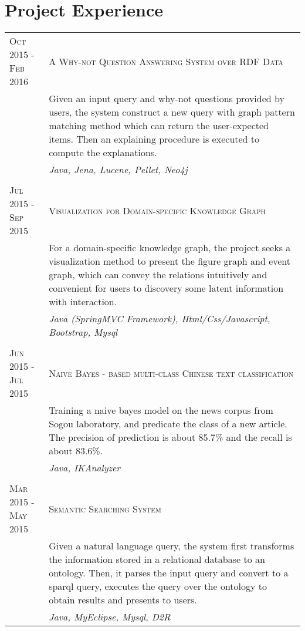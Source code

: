 \documentclass[a4paper,10pt]{article}
\begin{document}
\section{Project Experience}
\begin{tabular}{R{3.2cm}|p{13cm}}
%
 \textsc{Oct 2015 - Feb 2016} 		& \textsc{A Why-not Question Answering System over RDF Data} \\
 							& \small{Given an input query and why-not questions provided by users, the system construct a new query with graph pattern matching method which can return the user-expected items. Then an explaining procedure is executed to compute the explanations.} \\
                            & \emph{Java, Jena, Lucene, Pellet, Neo4j} \\
%
  \\
 \textsc{Jul 2015 - Sep 2015} 		& \textsc{Visualization for Domain-specific Knowledge Graph} \\
 							& \small{For a domain-specific knowledge graph, the project seeks a visualization method to present the figure graph and event graph, which can convey the relations intuitively and convenient for users to discovery some latent information with interaction.}\\
                            & \emph{Java (SpringMVC Framework), Html/Css/Javascript, Bootstrap, Mysql} \\
%
%
  \\
 \textsc{Jun 2015 - Jul 2015} 		& \textsc{Naive Bayes - based multi-class Chinese text classification} \\
 							& \small{Training a naive bayes model on the news corpus from Sogou laboratory, and predicate the class of a new article. The precision of prediction is about 85.7\% and the recall is about 83.6\%. }\\
                            & \emph{Java, IKAnalyzer} \\
%
%
  \\
 \textsc{Mar 2015 - May 2015} 		& \textsc{Semantic Searching System} \\
 							& \small{Given a natural language query, the system first transforms the information stored in a relational database to an ontology. Then, it parses the input query and convert to a sparql query, executes the query over the ontology to obtain results and presents to users.  }\\
                            & \emph{Java, MyEclipse, Mysql, D2R} \\
%
\end{tabular}
\end{document}
